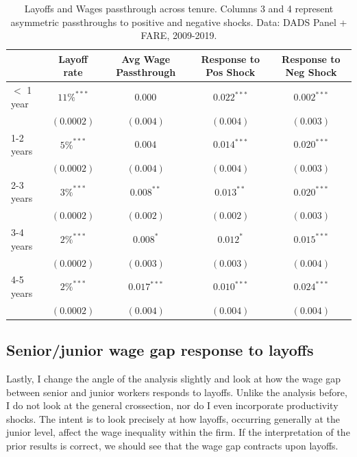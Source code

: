 \begin{table}
  \centering
  \begin{tabular}{lcccc}
    \hline
    & \multicolumn{1}{c}{Layoff rate} & \multicolumn{1}{c}{Avg Wage Passthrough} & \multicolumn{1}{c}{Response to Pos Shock} &  \multicolumn{1}{c}{Response to Neg Shock} \\
    \hline
     
    $<$ 1 year        &  $11\%^{***}$  &  $0.000^{}$   &  $0.022^{***}$ &  $0.002^{***}$ \\     
                        &  $(0.0002)$ & $(0.004)$     &  $(0.004)$  &   $(0.003)$   \\     
    1-2 years        &  $5\%^{***}$  &  $0.004^{}$     &   $0.014^{***}$ & $0.020^{***}$   \\      
                        &  $(0.0002)$ & $(0.004)$     &  $(0.004)$   &  $(0.003)$    \\     
    2-3 years        &  $3\%^{***}$   & $0.008^{**}$     &  $0.013^{**}$ & $0.020^{***}$    \\      
                        &  $(0.0002)$ & $(0.002)$     &  $(0.002)$ &   $(0.003)$    \\     
    3-4 years        & $2\%^{***}$   & $0.008^{*}$     &  $0.012^{*}$ &   $0.015^{***}$    \\ 
                        &  $(0.0002)$  & $(0.003)$    &    $(0.003)$ & $(0.004)$   \\     
    4-5 years        & $2\%^{***}$   & $0.017^{***}$     & $0.010^{***}$ &   $0.024^{***}$   \\     
                        &  $(0.0002)$  &  $(0.004)$   &    $(0.004)$ &  $(0.004)$   \\  

    \hline
  \end{tabular}
  \caption{Layoffs and Wages passthrough across tenure. Columns 3 and 4 represent asymmetric passthroughs to positive and negative shocks. Data: DADS Panel + FARE, 2009-2019.} %
  \label{tab:tenure}
\end{table}
\subsection{Senior/junior wage gap response to layoffs} %
Lastly, I  change the angle of the analysis slightly and look at how the wage gap between senior and junior workers responds to layoffs. Unlike the analysis before, I do not look at the general crossection, nor do I even incorporate productivity shocks. The intent is to look precisely at how layoffs, occurring generally at the junior level, affect the wage inequality within the firm. If the interpretation of the prior results is correct, we should see that the wage gap contracts upon layoffs. \\

